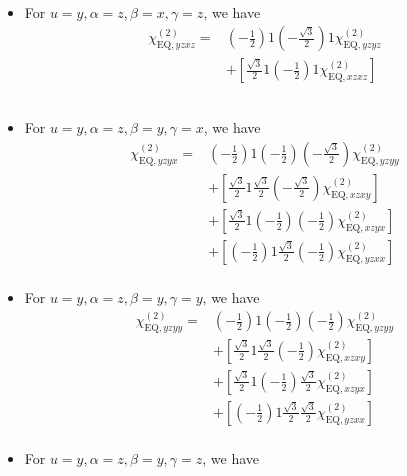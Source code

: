 \documentclass[UTF8,10pt,a4paper]{article}
\begin{document}
\begin{itemize}
\begin{align}
&
\end{align}\normalsize
\item For $u=y,\alpha=z,\beta=x,\gamma=z$, we have
\footnotesize\begin{align}
\nonumber\chi_{\text{EQ},yzxz}^{(2)}=&\left(-\frac{1}{2}\right)1\left(-\frac{\sqrt{3}}{2}\right)1\chi_{\text{EQ},yzyz}^{(2)}\\
\nonumber&+\left[\frac{\sqrt{3}}{2}1\left(-\frac{1}{2}\right)1\chi_{\text{EQ},xzxz}^{(2)}\right]\\
\nonumber&\\
\nonumber&\\
&
\end{align}\normalsize
\item For $u=y,\alpha=z,\beta=y,\gamma=x$, we have
\footnotesize\begin{align}
\nonumber\chi_{\text{EQ},yzyx}^{(2)}=&\left(-\frac{1}{2}\right)1\left(-\frac{1}{2}\right)\left(-\frac{\sqrt{3}}{2}\right)\chi_{\text{EQ},yzyy}^{(2)}\\
\nonumber&+\left[\frac{\sqrt{3}}{2}1\frac{\sqrt{3}}{2}\left(-\frac{\sqrt{3}}{2}\right)\chi_{\text{EQ},xzxy}^{(2)}\right]\\
\nonumber&+\left[\frac{\sqrt{3}}{2}1\left(-\frac{1}{2}\right)\left(-\frac{1}{2}\right)\chi_{\text{EQ},xzyx}^{(2)}\right]\\
\nonumber&+\left[\left(-\frac{1}{2}\right)1\frac{\sqrt{3}}{2}\left(-\frac{1}{2}\right)\chi_{\text{EQ},yzxx}^{(2)}\right]\\
&
\end{align}\normalsize
\item For $u=y,\alpha=z,\beta=y,\gamma=y$, we have
\footnotesize\begin{align}
\nonumber\chi_{\text{EQ},yzyy}^{(2)}=&\left(-\frac{1}{2}\right)1\left(-\frac{1}{2}\right)\left(-\frac{1}{2}\right)\chi_{\text{EQ},yzyy}^{(2)}\\
\nonumber&+\left[\frac{\sqrt{3}}{2}1\frac{\sqrt{3}}{2}\left(-\frac{1}{2}\right)\chi_{\text{EQ},xzxy}^{(2)}\right]\\
\nonumber&+\left[\frac{\sqrt{3}}{2}1\left(-\frac{1}{2}\right)\frac{\sqrt{3}}{2}\chi_{\text{EQ},xzyx}^{(2)}\right]\\
\nonumber&+\left[\left(-\frac{1}{2}\right)1\frac{\sqrt{3}}{2}\frac{\sqrt{3}}{2}\chi_{\text{EQ},yzxx}^{(2)}\right]\\
&
\end{align}\normalsize
\item For $u=y,\alpha=z,\beta=y,\gamma=z$, we have
\footnotesize\begin{align}

\end{align}
\end{itemize}
\end{document}
